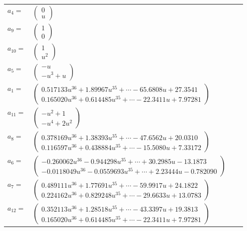 \documentclass[1p]{elsarticle_modified}
\theoremstyle{definition}
\begin{document}
\begin{tabular}{m{7pt} m{180pt} m{7pt} m{180pt} }
\flushright $a_{4}=$&$\begin{pmatrix}0\\u\end{pmatrix}$ \\
\flushright $a_{9}=$&$\begin{pmatrix}1\\0\end{pmatrix}$ \\
\flushright $a_{10}=$&$\begin{pmatrix}1\\u^2\end{pmatrix}$ \\
\flushright $a_{5}=$&$\begin{pmatrix}- u\\- u^3+u\end{pmatrix}$ \\
\flushright $a_{1}=$&$\begin{pmatrix}0.517133 u^{36}+1.89967 u^{35}+\cdots-65.6808 u+27.3541\\0.165020 u^{36}+0.614485 u^{35}+\cdots-22.3411 u+7.97281\end{pmatrix}$ \\
\flushright $a_{11}=$&$\begin{pmatrix}- u^2+1\\- u^4+2 u^2\end{pmatrix}$ \\
\flushright $a_{8}=$&$\begin{pmatrix}0.378169 u^{36}+1.38393 u^{35}+\cdots-47.6562 u+20.0310\\0.116597 u^{36}+0.438884 u^{35}+\cdots-15.5080 u+7.33172\end{pmatrix}$ \\
\flushright $a_{6}=$&$\begin{pmatrix}-0.260062 u^{36}-0.944298 u^{35}+\cdots+30.2985 u-13.1873\\-0.0118049 u^{36}-0.0559693 u^{35}+\cdots+2.23444 u-0.782090\end{pmatrix}$ \\
\flushright $a_{7}=$&$\begin{pmatrix}0.489111 u^{36}+1.77691 u^{35}+\cdots-59.9917 u+24.1822\\0.224162 u^{36}+0.829248 u^{35}+\cdots-29.6633 u+13.0783\end{pmatrix}$ \\
\flushright $a_{12}=$&$\begin{pmatrix}0.352113 u^{36}+1.28518 u^{35}+\cdots-43.3397 u+19.3813\\0.165020 u^{36}+0.614485 u^{35}+\cdots-22.3411 u+7.97281\end{pmatrix}$ \\

\end{tabular}
\end{document}

